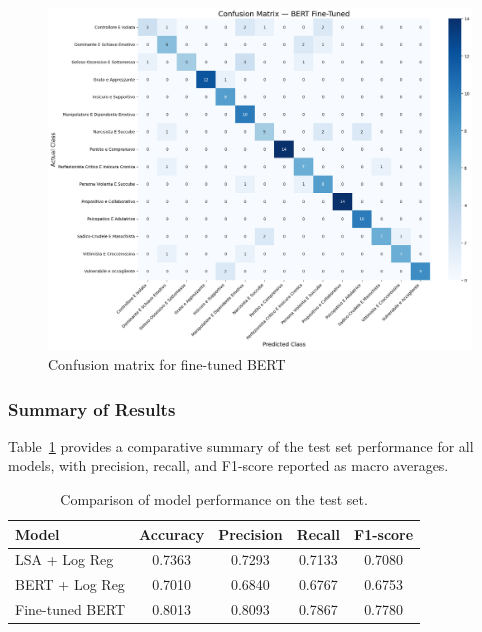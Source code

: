 \documentclass[conference]{IEEEtran}
\begin{document}
\begin{figure}[H]
  \centering
  \includegraphics[width=\columnwidth]{figures/bert_finetuned_confusion_matrix.png}
  \caption{Confusion matrix for fine-tuned BERT}
  \label{fig:bert_cm}
\end{figure}

\vspace{1em}

\subsubsection{Summary of Results}
\noindent

Table~\ref{tab:all_results} provides a comparative summary of the test set performance for all models, with precision, recall, and F1-score reported as macro averages.

\begin{table}[H]
  \centering
  \begin{tabular}{lcccc}
    \toprule
    \textbf{Model} & \textbf{Accuracy} & \textbf{Precision} & \textbf{Recall} & \textbf{F1-score} \\
    \midrule
    LSA + Log Reg & 0.7363 & 0.7293 & 0.7133 & 0.7080 \\
    BERT + Log Reg & 0.7010 & 0.6840 & 0.6767 & 0.6753 \\
    Fine-tuned BERT & 0.8013 & 0.8093 & 0.7867 & 0.7780 \\
    \bottomrule
  \end{tabular}
  \caption{Comparison of model performance on the test set.}
  \label{tab:all_results}
\end{table}
\end{document}
